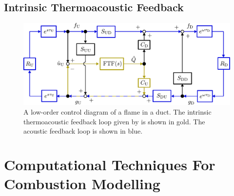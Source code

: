 






\subsection{Intrinsic Thermoacoustic Feedback}

\begin{figure}[t]
\centering
\includegraphics[scale=0.65]{assets/imgs/ITA-mech.pdf}
\caption{A low-order control diagram of a flame in a duct. The intrinsic thermoacoustic feedback loop given by \cite{emmert2015IntrinsicThermoacousticInstability} is shown in gold. The acoustic feedback loop is shown in blue.}
\label{fig:ita-loop}
\end{figure}





\cite{emmert2015IntrinsicThermoacousticInstability}
\cite{silva2023IntrinsicThermoacousticInstabilities}
\cite{hoeijmakers2014IntrinsicInstabilityFlame}
\cite{hoeijmakers2016FlameDominatedThermoacoustic}
\cite{orchini2025TrackingAcousticIntrinsic}
\cite{chen2024BiglobalLinearStability}






\section{Computational Techniques For Combustion Modelling}

